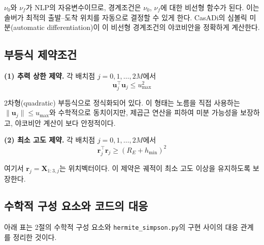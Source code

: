 \documentclass[11pt]{article}
\begin{document}
$\nu_0$와 $\nu_f$가 NLP의 자유변수이므로, 경계조건은 $\nu_0$, $\nu_f$에 대한 비선형 함수가 된다. 이는 솔버가 최적의 출발--도착 위치를 자동으로 결정할 수 있게 한다. CasADi의 심볼릭 미분(automatic differentiation)이 이 비선형 경계조건의 야코비안을 정확하게 계산한다.


\subsection{부등식 제약조건}
\label{sec:inequality}

\textbf{(1) 추력 상한 제약.} 각 배치점 $j = 0, 1, \ldots, 2M$에서
\[
\mathbf{u}_j^\top \mathbf{u}_j \leq u_{\max}^2
\]

2차형(quadratic) 부등식으로 정식화되어 있다. 이 형태는 노름을 직접 사용하는 $\|\mathbf{u}_j\| \leq u_{\max}$와 수학적으로 동치이지만, 제곱근 연산을 피하여 미분 가능성을 보장하고, 야코비안 계산이 보다 안정적이다.

\textbf{(2) 최소 고도 제약.} 각 배치점 $j = 0, 1, \ldots, 2M$에서
\[
\mathbf{r}_j^\top \mathbf{r}_j \geq (R_E + h_{\min})^2
\]

여기서 $\mathbf{r}_j = \mathbf{X}_{1:3, j}$는 위치벡터이다. 이 제약은 궤적이 최소 고도 이상을 유지하도록 보장한다.


\subsection{수학적 구성 요소와 코드의 대응}
\label{sec:code-mapping}

아래 표는 2절의 수학적 구성 요소와 \texttt{hermite\_simpson.py}의 구현 사이의 대응 관계를 정리한 것이다.
\end{document}
